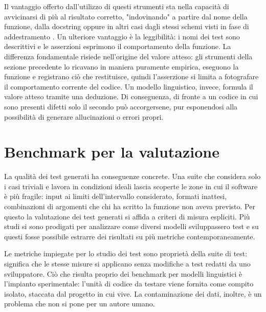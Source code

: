 Il vantaggio offerto dall'utilizzo di questi strumenti sta nella capacità di avvicinarsi di più al risultato corretto, "indovinando" a partire dal nome della funzione, dalla docstring oppure in altri casi dagli stessi schemi visti in fase di addestramento \cite{schaefer2024testpilot}. Un ulteriore vantaggio è la leggibilità: i nomi dei test sono descrittivi e le asserzioni esprimono il comportamento della funzione. La differenza fondamentale risiede nell'origine del valore atteso: gli strumenti della sezione precedente lo ricavano in maniera puramente empirica, eseguono la funzione e registrano ciò che restituisce, quindi l'asserzione si limita a fotografare il comportamento corrente del codice. Un modello linguistico, invece, formula il valore atteso tramite una deduzione. Di conseguenza, di fronte a un codice in cui sono presenti difetti solo il secondo può accorgersene, pur esponendosi alla possibilità di generare allucinazioni o errori propri. 


\section{Benchmark per la valutazione}
\label{sec:bench}
La qualità dei test generati ha conseguenze concrete. Una suite che considera solo i casi triviali e lavora in condizioni ideali lascia scoperte le zone in cui il software è più fragile: input ai limiti dell'intervallo considerato, formati inattesi, combinazioni di argomenti che chi ha scritto la funzione non aveva previsto. Per questo la valutazione dei test generati si affida a criteri di misura espliciti. Più studi si sono prodigati per analizzare come diversi modelli sviluppassero test e su questi fosse possibile estrarre dei risultati su più metriche contemporaneamente. 

Le metriche impiegate per lo studio dei test sono proprietà della suite di test: significa che le stesse misure si applicano senza modifiche a test redatti da uno sviluppatore. Ciò che risulta proprio dei benchmark per modelli linguistici è l'impianto sperimentale: l'unità di codice da testare viene fornita come compito isolato, staccata dal progetto in cui vive. La contaminazione dei dati, inoltre, è un problema che non si pone per un autore umano.

